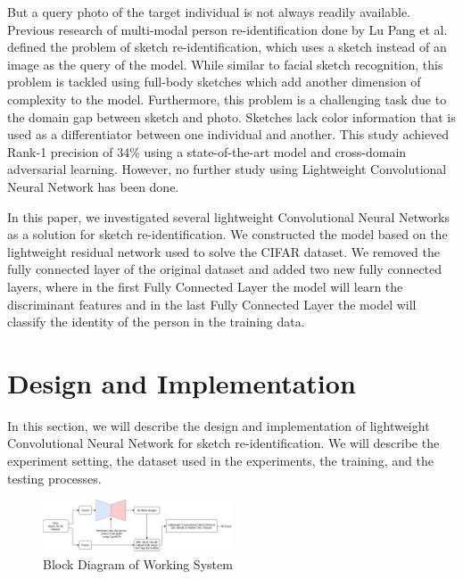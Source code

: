 \documentclass[conference]{IEEEtran}
\begin{document}
	\vspace{1ex} 
	
	But a query photo of the target individual is not always readily available. Previous research of multi-modal person re-identification done by Lu Pang et al.\cite{cit:5} defined the problem of sketch re-identification, which uses a sketch instead of an image as the query of the model. While similar to facial sketch recognition, this problem is tackled using full-body sketches which add another dimension of complexity to the model. Furthermore, this problem is a challenging task due to the domain gap between sketch and photo. Sketches lack color information that is used as a differentiator between one individual and another. This study achieved Rank-1 precision of 34\% using a state-of-the-art model and cross-domain adversarial learning. However, no further study using Lightweight Convolutional Neural Network has been done.
	
	\vspace{1ex} 
	
	In this paper, we investigated several lightweight Convolutional Neural Networks as a solution for sketch re-identification. We constructed the model based on the lightweight residual network used to solve the CIFAR dataset. We removed the fully connected layer of the original dataset and added two new fully connected layers, where in the first Fully Connected Layer the model will learn the discriminant features and in the last Fully Connected Layer the model will classify the identity of the person in the training data.
	
	\section{Design and Implementation}
	\vspace{1ex}
	In this section, we will describe the design and implementation of lightweight Convolutional Neural Network for sketch re-identification. We will describe the experiment setting, the dataset used in the experiments, the training, and the testing processes.
	\vspace{1ex}
	\begin{figure}[!ht] \centering
		\includegraphics[width=0.5\textwidth]{img/desain_sistem.png}
		\caption{Block Diagram of Working System}
		\label{fig:1}
	\end{figure}
	
\end{document}
